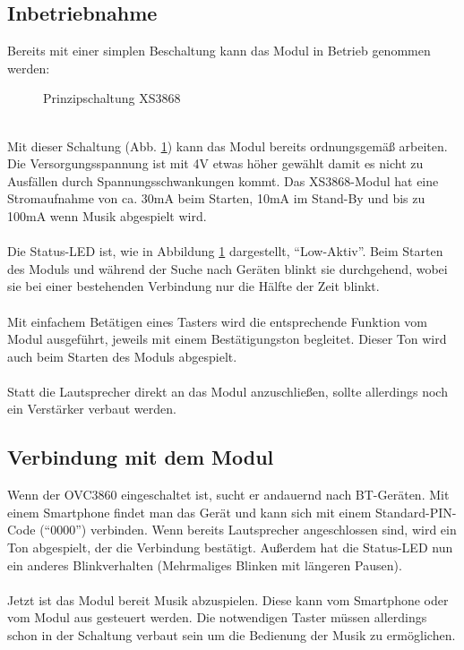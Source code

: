 \subsection{Inbetriebnahme}
Bereits mit einer simplen Beschaltung kann das Modul in Betrieb genommen werden:
\begin{figure} [h]
	\centering
	\caption{Prinzipschaltung XS3868}\label {fig:abb2.3}
\end{figure} \\
Mit dieser Schaltung (Abb. \ref {fig:abb2.3}) kann das Modul bereits ordnungsgemäß arbeiten.\\
Die Versorgungsspannung ist mit 4V etwas höher gewählt damit es nicht zu Ausfällen durch Spannungsschwankungen kommt. Das XS3868-Modul hat eine Stromaufnahme von ca. 30mA beim Starten, 10mA im Stand-By und bis zu 100mA wenn Musik abgespielt wird.\\ \\
Die Status-LED ist, wie in Abbildung \ref {fig:abb2.3} dargestellt, \enquote{Low-Aktiv}. Beim Starten des Moduls und während der Suche nach Geräten blinkt sie durchgehend, wobei sie bei einer bestehenden Verbindung nur die Hälfte der Zeit blinkt.\\ \\
Mit einfachem Betätigen eines Tasters wird die entsprechende Funktion vom Modul ausgeführt, jeweils mit einem Bestätigungston begleitet. Dieser Ton wird auch beim Starten des Moduls abgespielt.\\ \\
Statt die Lautsprecher direkt an das Modul anzuschließen, sollte allerdings noch ein Verstärker verbaut werden.
\newpage


\subsection{Verbindung mit dem Modul}
Wenn der OVC3860 eingeschaltet ist, sucht er andauernd nach BT-Geräten. Mit einem Smartphone findet man das Gerät und kann sich mit einem Standard-PIN-Code (\enquote{0000}) verbinden. Wenn bereits Lautsprecher angeschlossen sind, wird ein Ton abgespielt, der die Verbindung bestätigt. Außerdem hat die Status-LED nun ein anderes Blinkverhalten (Mehrmaliges Blinken mit längeren Pausen).\\ \\
Jetzt ist das Modul bereit Musik abzuspielen. Diese kann vom Smartphone oder vom Modul aus gesteuert werden. Die notwendigen Taster müssen allerdings schon in der Schaltung verbaut sein um die Bedienung der Musik zu ermöglichen.


